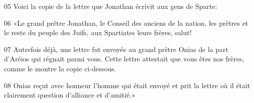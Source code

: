 
05 Voici la copie de la lettre que Jonathan écrivit aux gens de Sparte:

06 «Le grand prêtre Jonathan, le Conseil des anciens de la nation, les prêtres et le reste du peuple des Juifs, aux Spartiates leurs frères, salut!

07 Autrefois déjà, une lettre fut envoyée au grand prêtre Onias de la part d’Aréios qui régnait parmi vous. Cette lettre attestait que vous êtes nos frères, comme le montre la copie ci-dessous.

08 Onias reçut avec honneur l’homme qui était envoyé et prit la lettre où il était clairement question d’alliance et d’amitié.»
